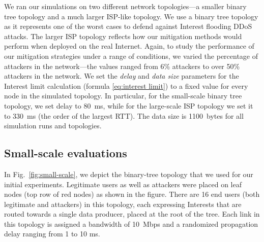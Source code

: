 \documentclass[10pt,conference]{IEEEtran}
\begin{document}
{We ran our simulations on two different network topologies---a smaller binary tree topology and a much larger ISP-like topology. We use a binary tree topology as it represents one of the worst cases to defend against Interest flooding DDoS attacks. The larger ISP topology reflects how our mitigation methods would perform when deployed on the real Internet.
Again, to study the performance of our mitigation strategies under a range of conditions, we varied the percentage of attackers in the network---the values ranged from 6\% attackers to over 50\% attackers in the network.
We set the \emph{delay} and \emph{data size} parameters for the Interest limit calculation (formula \ref{eq:interest limit}) to a fixed 
value for every node in the simulated topology. In particular, for the small-scale binary tree topology, we set delay to 80~ms, while for the large-scale ISP topology we set it to 330~ms (the order of the largest RTT). The data size is 1100~bytes for all simulation runs and topologies.



\subsection{Small-scale evaluations}
\label{sec:small-scale}

In Fig.~\ref{fig:small-scale}, we depict the binary-tree topology that we used for our initial experiments.
Legitimate users as well as attackers were placed on leaf nodes (top row of red nodes) as shown in the figure. There are 16 end users (both legitimate and attackers) in this topology, each expressing Interests that are routed towards a single data producer, placed at the root of the tree.  Each link in this topology is assigned a bandwidth of 10~Mbps and a randomized propagation delay ranging from 1 to 10 ms. 


}
\end{document}
